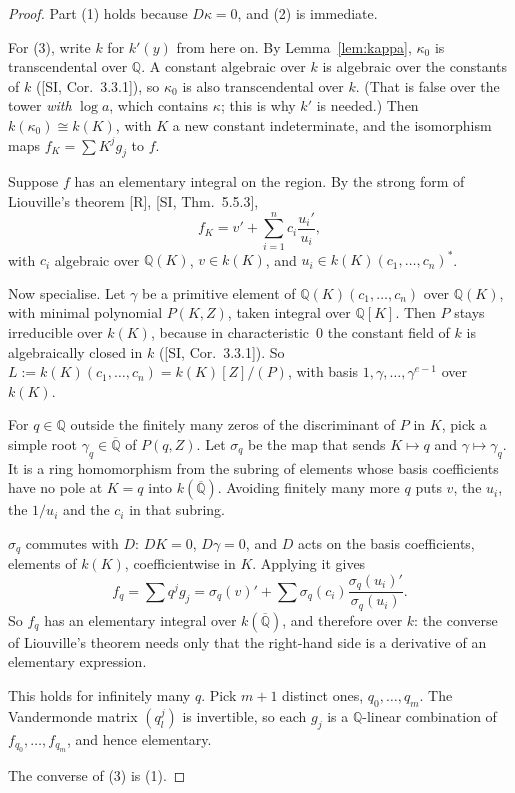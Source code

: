 \documentclass[11pt]{article}
\theoremstyle{definition}
\theoremstyle{remark}
\newcommand{\Q}{\mathbb{Q}}
\newcommand{\Qbar}{\overline{\mathbb{Q}}}
\begin{document}
\begin{proof}
Part (1) holds because $D\kappa=0$, and (2) is immediate.

For (3), write $k$ for $k'(y)$ from here on. By Lemma~\ref{lem:kappa},
$\kappa_0$ is transcendental over $\Q$. A constant algebraic over $k$ is
algebraic over the constants of $k$ ([SI, Cor.~3.3.1]), so $\kappa_0$ is also
transcendental over $k$. (That is false over the tower \emph{with} $\log a$,
which contains $\kappa$; this is why $k'$ is needed.) Then
$k(\kappa_0)\cong k(K)$, with $K$ a new constant indeterminate, and the
isomorphism maps $f_K=\sum K^jg_j$ to $f$.

Suppose $f$ has an elementary integral on the region. By the strong form of
Liouville's theorem [R], [SI, Thm.~5.5.3],
\[ f_K=v'+\sum_{i=1}^n c_i\frac{u_i'}{u_i}, \]
with $c_i$ algebraic over $\Q(K)$, $v\in k(K)$, and
$u_i\in k(K)(c_1,\dots,c_n)^*$.

Now specialise. Let $\gamma$ be a primitive element of
$\Q(K)(c_1,\dots,c_n)$ over $\Q(K)$, with minimal polynomial $P(K,Z)$, taken
integral over $\Q[K]$. Then $P$ stays irreducible over $k(K)$, because in
characteristic~0 the constant field of $k$ is algebraically closed in $k$
([SI, Cor.~3.3.1]). So $L:=k(K)(c_1,\dots,c_n)=k(K)[Z]/(P)$, with basis
$1,\gamma,\dots,\gamma^{e-1}$ over $k(K)$.

For $q\in\Q$ outside the finitely many zeros of the discriminant of $P$ in $K$,
pick a simple root $\gamma_q\in\Qbar$ of $P(q,Z)$. Let $\sigma_q$ be the map
that sends $K\mapsto q$ and $\gamma\mapsto\gamma_q$. It is a ring homomorphism
from the subring of elements whose basis coefficients have no pole at $K=q$
into $k(\Qbar)$. Avoiding finitely many more $q$ puts $v$, the $u_i$, the
$1/u_i$ and the $c_i$ in that subring.

$\sigma_q$ commutes with $D$: $DK=0$, $D\gamma=0$, and $D$ acts on the basis
coefficients, elements of $k(K)$, coefficientwise in $K$. Applying it gives
\[ f_q=\sum q^jg_j=\sigma_q(v)'+\sum\sigma_q(c_i)\frac{\sigma_q(u_i)'}{\sigma_q(u_i)}. \]
So $f_q$ has an elementary integral over $k(\Qbar)$, and therefore over $k$:
the converse of Liouville's theorem needs only that the right-hand side is a
derivative of an elementary expression.

This holds for infinitely many $q$. Pick $m+1$ distinct ones,
$q_0,\dots,q_m$. The Vandermonde matrix $(q_l^j)$ is invertible, so each $g_j$
is a $\Q$-linear combination of $f_{q_0},\dots,f_{q_m}$, and hence elementary.

The converse of (3) is (1).
\end{proof}
\end{document}
